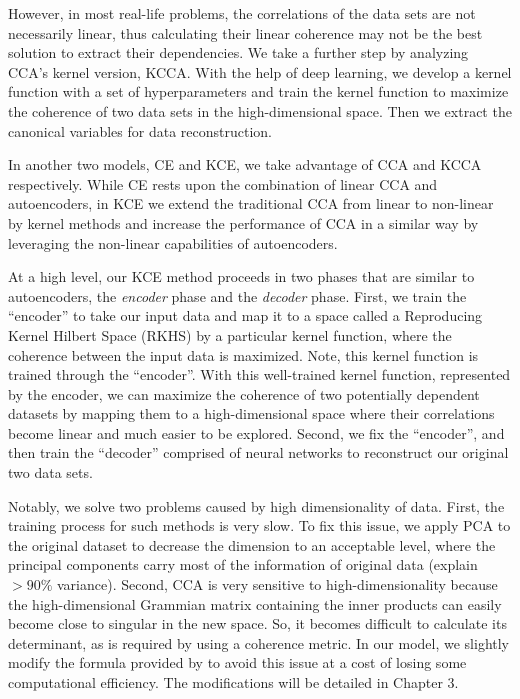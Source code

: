 \documentclass[12pt]{report} %
\begin{document}
However, in most real-life problems, the correlations of the data sets are not necessarily linear, thus calculating their linear coherence may not be the best solution to extract their dependencies. We take a further step by analyzing CCA's kernel version, KCCA. With the help of deep learning, we develop a kernel function with a set of hyperparameters and train the kernel function to maximize the coherence of two data sets in the high-dimensional space. Then we extract the canonical variables for data reconstruction.

In another two models, CE and KCE, we take advantage of CCA and KCCA respectively. While CE rests upon the combination of linear CCA and autoencoders, in KCE we extend the traditional CCA from linear to non-linear by kernel methods and increase the performance of CCA in a similar way by leveraging the non-linear capabilities of autoencoders.

At a high level, our KCE method proceeds in two phases that are similar to autoencoders, the \textit{encoder} phase and the \textit{decoder} phase. First, we train the ``encoder'' to take our input data and map it to a space called a Reproducing Kernel Hilbert Space (RKHS)\cite{RKHS} by a particular kernel function, where the coherence between the input data is maximized. Note, this kernel function is trained through the ``encoder''. With this well-trained kernel function, represented by the encoder, we can maximize the coherence of two potentially dependent datasets by mapping them to a high-dimensional space where their correlations become linear and much easier to be explored. Second, we fix the ``encoder'', and then train the ``decoder'' comprised of neural networks to reconstruct our original two data sets.

Notably, we solve two problems caused by high dimensionality of data. First, the training process for such methods is very slow. To fix this issue, we apply PCA to the original dataset to decrease the dimension to an acceptable level, where the principal components carry most of the information of original data (explain $>90\%$ variance). Second, CCA is very sensitive to high-dimensionality because the high-dimensional Grammian matrix\cite{GM} containing the inner products can easily become close to singular\cite{SM} in the new space. So, it becomes difficult to calculate its determinant, as is required by using a coherence metric. In our model, we slightly modify the formula provided by \cite{ECCA} to avoid this issue at a cost of losing some computational efficiency. The modifications will be detailed in Chapter 3.
\end{document}
